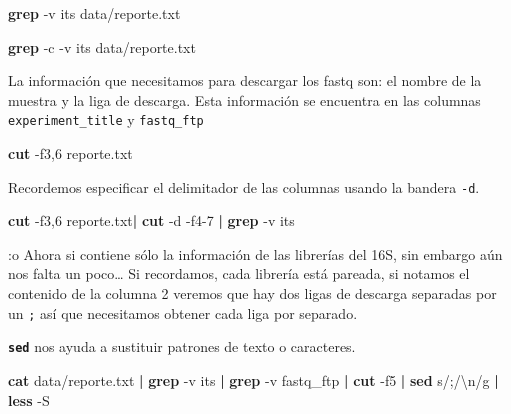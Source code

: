 \documentclass[
]{book}
\newenvironment{Shaded}{\begin{snugshade}}{\end{snugshade}}
\newcommand{\AttributeTok}[1]{\textcolor[rgb]{0.13,0.29,0.53}{#1}}
\newcommand{\FunctionTok}[1]{\textcolor[rgb]{0.13,0.29,0.53}{\textbf{#1}}}
\newcommand{\KeywordTok}[1]{\textcolor[rgb]{0.13,0.29,0.53}{\textbf{#1}}}
\newcommand{\NormalTok}[1]{#1}
\newcommand{\StringTok}[1]{\textcolor[rgb]{0.31,0.60,0.02}{#1}}
\begin{document}
\begin{Shaded}
\begin{Highlighting}[]
\FunctionTok{grep} \AttributeTok{{-}v} \StringTok{\textquotesingle{}its\textquotesingle{}}\NormalTok{ data/reporte.txt}
\end{Highlighting}
\end{Shaded}

\begin{Shaded}
\begin{Highlighting}[]
\FunctionTok{grep} \AttributeTok{{-}c} \AttributeTok{{-}v} \StringTok{\textquotesingle{}its\textquotesingle{}}\NormalTok{ data/reporte.txt}
\end{Highlighting}
\end{Shaded}

La información que necesitamos para descargar los fastq son: el nombre de la muestra y la liga de descarga. Esta información se encuentra en las columnas \texttt{experiment\_title} y \texttt{fastq\_ftp}

\begin{Shaded}
\begin{Highlighting}[]
\FunctionTok{cut} \AttributeTok{{-}f3,6}\NormalTok{ reporte.txt}
\end{Highlighting}
\end{Shaded}

Recordemos especificar el delimitador de las columnas usando la bandera \texttt{-d}.

\begin{Shaded}
\begin{Highlighting}[]
\FunctionTok{cut} \AttributeTok{{-}f3,6}\NormalTok{ reporte.txt}\KeywordTok{|} \FunctionTok{cut} \AttributeTok{{-}d}\StringTok{\textquotesingle{} \textquotesingle{}} \AttributeTok{{-}f4{-}7} \KeywordTok{|} \FunctionTok{grep} \AttributeTok{{-}v} \StringTok{\textquotesingle{}its\textquotesingle{}}
\end{Highlighting}
\end{Shaded}

:o Ahora si contiene sólo la información de las librerías del 16S, sin embargo aún nos falta un poco\ldots{}
Si recordamos, cada librería está pareada, si notamos el contenido de la columna 2 veremos que hay dos ligas de descarga separadas por un \texttt{;} así que necesitamos obtener cada liga por separado.

\textbf{\texttt{sed}} nos ayuda a sustituir patrones de texto o caracteres.

\begin{Shaded}
\begin{Highlighting}[]
\FunctionTok{cat}\NormalTok{ data/reporte.txt  }\KeywordTok{|} \FunctionTok{grep} \AttributeTok{{-}v} \StringTok{\textquotesingle{}its\textquotesingle{}} \KeywordTok{|}  \FunctionTok{grep} \AttributeTok{{-}v} \StringTok{\textquotesingle{}fastq\_ftp\textquotesingle{}} \KeywordTok{|} \FunctionTok{cut} \AttributeTok{{-}f5} \KeywordTok{|} \FunctionTok{sed} \StringTok{\textquotesingle{}s/;/\textbackslash{}n/g\textquotesingle{}} \KeywordTok{|} \FunctionTok{less} \AttributeTok{{-}S}
\end{Highlighting}
\end{Shaded}
\end{document}
